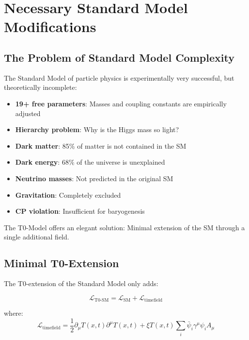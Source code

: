 \documentclass[12pt,a4paper]{report}
\newcommand{\Tfield}{T(x,t)}  %
\newcommand{\xipar}{\xi}      %
\begin{document}
	\section{Necessary Standard Model Modifications}\label{sec:sm_modifications}
	
	\subsection{The Problem of Standard Model Complexity}\label{subsec:sm_complexity}
	
	The Standard Model of particle physics is experimentally very successful, but theoretically incomplete:
	
	\begin{itemize}
		\item \textbf{19+ free parameters}: Masses and coupling constants are empirically adjusted
		\item \textbf{Hierarchy problem}: Why is the Higgs mass so light?
		\item \textbf{Dark matter}: 85\% of matter is not contained in the SM
		\item \textbf{Dark energy}: 68\% of the universe is unexplained
		\item \textbf{Neutrino masses}: Not predicted in the original SM
		\item \textbf{Gravitation}: Completely excluded
		\item \textbf{CP violation}: Insufficient for baryogenesis
	\end{itemize}
	
	The T0-Model offers an elegant solution: Minimal extension of the SM through a single additional field.
	
	\subsection{Minimal T0-Extension}\label{subsec:minimal_extension}
	
	The T0-extension of the Standard Model only adds:
	
	\begin{equation}\label{eq:t0_extension}
		\mathcal{L}_{\text{T0-SM}} = \mathcal{L}_{\text{SM}} + \mathcal{L}_{\text{timefield}}
	\end{equation}
	
	where:
	\begin{equation}\label{eq:timefield_lagrangian}
		\mathcal{L}_{\text{timefield}} = \frac{1}{2} \partial_\mu \Tfield \partial^\mu \Tfield + \xipar \Tfield \sum_i \bar{\psi}_i \gamma^\mu \psi_i A_\mu
	\end{equation}
	
\end{document}
